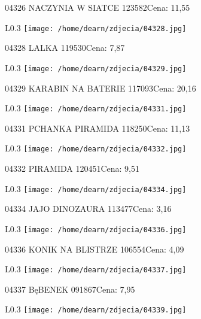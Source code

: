 04326 NACZYNIA W SIATCE                               123582Cena: 11,55\newline
\begin{wrapfigure}{L}{0.3\textwidth}
\texttt{[image: /home/dearn/zdjecia/04328.jpg]}
\end{wrapfigure}
04328 LALKA                                           119530Cena: 7,87\newline
\begin{wrapfigure}{L}{0.3\textwidth}
\texttt{[image: /home/dearn/zdjecia/04329.jpg]}
\end{wrapfigure}
04329 KARABIN NA BATERIE                              117093Cena: 20,16\newline
\begin{wrapfigure}{L}{0.3\textwidth}
\texttt{[image: /home/dearn/zdjecia/04331.jpg]}
\end{wrapfigure}
04331 PCHANKA PIRAMIDA                                118250Cena: 11,13\newline
\begin{wrapfigure}{L}{0.3\textwidth}
\texttt{[image: /home/dearn/zdjecia/04332.jpg]}
\end{wrapfigure}
04332 PIRAMIDA                                        120451Cena: 9,51\newline
\begin{wrapfigure}{L}{0.3\textwidth}
\texttt{[image: /home/dearn/zdjecia/04334.jpg]}
\end{wrapfigure}
04334 JAJO DINOZAURA                                  113477Cena: 3,16\newline
\begin{wrapfigure}{L}{0.3\textwidth}
\texttt{[image: /home/dearn/zdjecia/04336.jpg]}
\end{wrapfigure}
04336 KONIK NA BLISTRZE                               106554Cena: 4,09\newline
\begin{wrapfigure}{L}{0.3\textwidth}
\texttt{[image: /home/dearn/zdjecia/04337.jpg]}
\end{wrapfigure}
04337 BęBENEK                                         091867Cena: 7,95\newline
\begin{wrapfigure}{L}{0.3\textwidth}
\texttt{[image: /home/dearn/zdjecia/04339.jpg]}
\end{wrapfigure}
